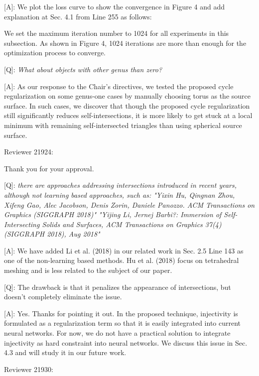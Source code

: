 \documentclass[10pt]{letter} %
\newcommand{\mdf}[1]{\textcolor[rgb]{1.00,0.00,1.00}{#1}}
\begin{document}
	[A]: We plot the loss curve to show the convergence in Figure 4 and add explanation at Sec. 4.1 from Line 255 as follows:
	
	\mdf{We set the maximum iteration number to 1024 for all experiments in this subsection. As shown in Figure 4, 1024 iterations are more than enough for the optimization process to converge.}
	
	[Q]: \emph{What about objects with other genus than zero?}
	
	[A]: As our response to the Chair's directives, we tested the proposed cycle regularization on some genus-one cases by manually choosing torus as the source surface. In such cases, we discover that though the proposed cycle regularization still significantly reduces self-intersections, it is more likely to get stuck at a local minimum with remaining self-intersected triangles than using spherical source surface.   
	 
	\hdashrule{\linewidth}{1pt}{1mm}
	Reviewer 21924:
	
	Thank you for your approval.
	
	[Q]: \emph{there are approaches addressing intersections introduced in recent years, although not learning based approaches, such as:
	"Yixin Hu, Qingnan Zhou, Xifeng Gao, Alec Jacobson, Denis Zorin, Daniele Panozzo. ACM Transactions on Graphics (SIGGRAPH 2018)"
	"Yijing Li, Jernej Barbi?: Immersion of Self-Intersecting Solids and Surfaces, ACM Transactions on Graphics 37(4) (SIGGRAPH 2018), Aug 2018"}
	
	[A]: We have added Li et al. (2018) in our related work in Sec. 2.5 Line 143 as one of the non-learning based methods. Hu et al. (2018) focus on tetrahedral meshing and is less related to the subject of our paper.
	
	[Q]: The drawback is that it penalizes the appearance of intersections, but doesn't completely eliminate the issue.
	
	[A]: Yes. Thanks for pointing it out. In the proposed technique, injectivity is formulated as a regularization term so that it is easily integrated into current neural networks. For now, we do not have a practical solution to integrate injectivity as hard constraint into neural networks. We discuss this issue in Sec. 4.3 and will study it in our future work. 
	
	\hdashrule{\linewidth}{1pt}{1mm}
	Reviewer 21930:
	
\end{document}

